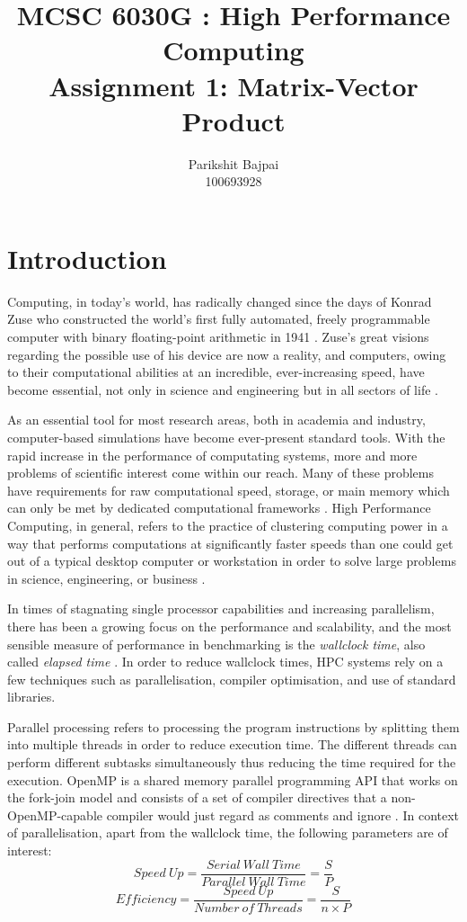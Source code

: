 \documentclass[11pt, oneside]{article}   	%
\title{MCSC 6030G : High Performance Computing \\ Assignment 1: Matrix-Vector Product}
\author{Parikshit Bajpai \\ 100693928}
\date{}							%
\begin{document}
\maketitle

\section{Introduction}
Computing, in today's world, has radically changed since the days of Konrad Zuse who constructed the world's first fully automated, freely   programmable computer with binary floating-point arithmetic in 1941 \cite{Rojas:2002aa}.  Zuse's  great visions regarding the possible use of his device are now a reality, and computers, owing to their computational abilities at an incredible, ever-increasing speed, have become essential, not only in science and engineering but in all sectors of life \cite{Zuse:1993aa}.

As an essential tool for most research areas, both in academia and industry, computer-based simulations have become ever-present standard tools. With the rapid increase in the performance of computating systems, more and more problems of scientific interest come within our reach. Many of these problems have requirements for raw computational speed, storage, or main memory which can only be met by dedicated computational frameworks \cite{Hager:2010aa}. High Performance Computing, in general, refers to the practice of clustering computing power in a way that performs computations at significantly faster speeds than one could get out of a typical desktop computer or workstation in order to solve large problems in science, engineering, or business \cite{insidehpc:aa}.

In times of stagnating single processor capabilities and increasing parallelism, there has been a growing focus on the performance and scalability, and the most sensible measure of performance in benchmarking is the \textit{wallclock time}, also called \textit{elapsed time} \cite{Hager:2010aa}. In order to reduce wallclock times, HPC systems rely on a few techniques such as parallelisation, compiler optimisation, and use of standard libraries.

Parallel processing refers to processing the program instructions by splitting them into multiple threads in order to reduce execution time. The different threads can perform different subtasks simultaneously thus reducing the time required for the execution. OpenMP is a shared memory parallel programming API that works on the fork-join model and consists of a set of compiler directives that a non-OpenMP-capable compiler would just regard as comments and ignore \cite{Board:2015aa}. In context of parallelisation, apart from the wallclock time, the following parameters are of interest:
\begin{equation} \label{Speedup}
Speed \: Up = \frac{Serial \: Wall \: Time}{Parallel \: Wall \: Time} = \frac{S}{P}
\end{equation}
\begin{equation} \label{Efficiency}
Efficiency = \frac{Speed  \: Up}{Number \: of  \: Threads} = \frac{S}{n \times P}
\end{equation}
\end{document}
